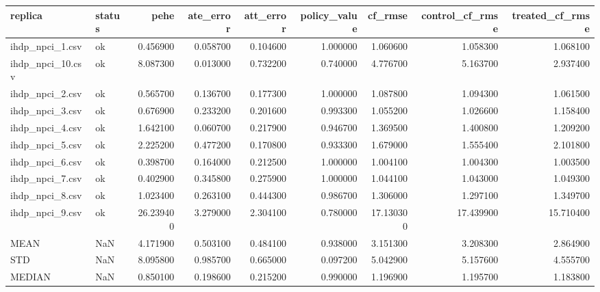 \begin{tabular}{llrrrrrrr}
\toprule
replica & status & pehe & ate_error & att_error & policy_value & cf_rmse & control_cf_rmse & treated_cf_rmse \\
\midrule
ihdp_npci_1.csv & ok & 0.456900 & 0.058700 & 0.104600 & 1.000000 & 1.060600 & 1.058300 & 1.068100 \\
ihdp_npci_10.csv & ok & 8.087300 & 0.013000 & 0.732200 & 0.740000 & 4.776700 & 5.163700 & 2.937400 \\
ihdp_npci_2.csv & ok & 0.565700 & 0.136700 & 0.177300 & 1.000000 & 1.087800 & 1.094300 & 1.061500 \\
ihdp_npci_3.csv & ok & 0.676900 & 0.233200 & 0.201600 & 0.993300 & 1.055200 & 1.026600 & 1.158400 \\
ihdp_npci_4.csv & ok & 1.642100 & 0.060700 & 0.217900 & 0.946700 & 1.369500 & 1.400800 & 1.209200 \\
ihdp_npci_5.csv & ok & 2.225200 & 0.477200 & 0.170800 & 0.933300 & 1.679000 & 1.555400 & 2.101800 \\
ihdp_npci_6.csv & ok & 0.398700 & 0.164000 & 0.212500 & 1.000000 & 1.004100 & 1.004300 & 1.003500 \\
ihdp_npci_7.csv & ok & 0.402900 & 0.345800 & 0.275900 & 1.000000 & 1.044100 & 1.043000 & 1.049300 \\
ihdp_npci_8.csv & ok & 1.023400 & 0.263100 & 0.444300 & 0.986700 & 1.306000 & 1.297100 & 1.349700 \\
ihdp_npci_9.csv & ok & 26.239400 & 3.279000 & 2.304100 & 0.780000 & 17.130300 & 17.439900 & 15.710400 \\
MEAN & NaN & 4.171900 & 0.503100 & 0.484100 & 0.938000 & 3.151300 & 3.208300 & 2.864900 \\
STD & NaN & 8.095800 & 0.985700 & 0.665000 & 0.097200 & 5.042900 & 5.157600 & 4.555700 \\
MEDIAN & NaN & 0.850100 & 0.198600 & 0.215200 & 0.990000 & 1.196900 & 1.195700 & 1.183800 \\
\bottomrule
\end{tabular}
